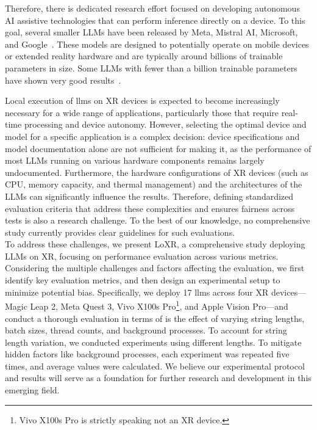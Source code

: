 Therefore, there is dedicated research effort focused on developing autonomous AI assistive technologies that can perform inference directly on a device. To this goal, several smaller LLMs have been released by Meta, Mistral AI, Microsoft, and Google~\cite{Liu2024}. These models are designed to potentially operate on mobile devices or extended reality hardware and are typically around billions of trainable parameters in size. Some LLMs with fewer than a billion trainable parameters have shown very good results~\cite{Liu2024}.


Local execution of \glspl{llm} on XR devices is expected to become increasingly necessary for a wide range of applications, particularly those that require real-time processing and device autonomy. However, selecting the optimal device and model for a specific application is a complex decision: device specifications and model documentation alone are not sufficient for making it, as the performance of most LLMs running on various hardware components remains largely undocumented. Furthermore, the hardware configurations of XR devices (such as CPU, memory capacity, and thermal management) and the architectures of the LLMs can significantly influence the results. Therefore, defining standardized evaluation criteria that address these complexities and ensures fairness across tests is also a research challenge. To the best of our knowledge, no comprehensive study currently provides clear guidelines for such evaluations. \\
To address these challenges, we present LoXR, a comprehensive study deploying LLMs on XR, focusing on performance evaluation across various metrics. Considering the multiple challenges and factors affecting the evaluation, we first identify key evaluation metrics, and then design an experimental setup to minimize potential bias. Specifically, we deploy 17 \glspl{llm} across four XR devices---Magic Leap 2, Meta Quest 3, Vivo X100s Pro\footnote{Vivo X100s Pro is strictly speaking not an XR device.
}, and Apple Vision Pro---and conduct a thorough evaluation in terms of 
 is the effect of varying string lengths, batch sizes, thread counts, and background processes. To account for string length variation, we conducted experiments using different lengths. To mitigate hidden factors like background processes, each experiment was repeated five times, and average values were calculated. 
We believe our experimental protocol and results will serve as a foundation for further research and development in this emerging field. 

